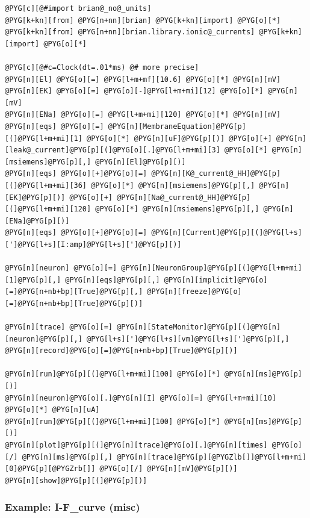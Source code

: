 \documentclass[letterpaper,10pt,english]{manual}
\begin{document}
\begin{Verbatim}[commandchars=@\[\]]
@PYG[c][@#import brian@_no@_units]
@PYG[k+kn][from] @PYG[n+nn][brian] @PYG[k+kn][import] @PYG[o][*]
@PYG[k+kn][from] @PYG[n+nn][brian.library.ionic@_currents] @PYG[k+kn][import] @PYG[o][*]

@PYG[c][@#c=Clock(dt=.01*ms) @# more precise]
@PYG[n][El] @PYG[o][=] @PYG[l+m+mf][10.6] @PYG[o][*] @PYG[n][mV]
@PYG[n][EK] @PYG[o][=] @PYG[o][-]@PYG[l+m+mi][12] @PYG[o][*] @PYG[n][mV]
@PYG[n][ENa] @PYG[o][=] @PYG[l+m+mi][120] @PYG[o][*] @PYG[n][mV]
@PYG[n][eqs] @PYG[o][=] @PYG[n][MembraneEquation]@PYG[p][(]@PYG[l+m+mi][1] @PYG[o][*] @PYG[n][uF]@PYG[p][)] @PYG[o][+] @PYG[n][leak@_current]@PYG[p][(]@PYG[o][.]@PYG[l+m+mi][3] @PYG[o][*] @PYG[n][msiemens]@PYG[p][,] @PYG[n][El]@PYG[p][)]
@PYG[n][eqs] @PYG[o][+]@PYG[o][=] @PYG[n][K@_current@_HH]@PYG[p][(]@PYG[l+m+mi][36] @PYG[o][*] @PYG[n][msiemens]@PYG[p][,] @PYG[n][EK]@PYG[p][)] @PYG[o][+] @PYG[n][Na@_current@_HH]@PYG[p][(]@PYG[l+m+mi][120] @PYG[o][*] @PYG[n][msiemens]@PYG[p][,] @PYG[n][ENa]@PYG[p][)]
@PYG[n][eqs] @PYG[o][+]@PYG[o][=] @PYG[n][Current]@PYG[p][(]@PYG[l+s][']@PYG[l+s][I:amp]@PYG[l+s][']@PYG[p][)]

@PYG[n][neuron] @PYG[o][=] @PYG[n][NeuronGroup]@PYG[p][(]@PYG[l+m+mi][1]@PYG[p][,] @PYG[n][eqs]@PYG[p][,] @PYG[n][implicit]@PYG[o][=]@PYG[n+nb+bp][True]@PYG[p][,] @PYG[n][freeze]@PYG[o][=]@PYG[n+nb+bp][True]@PYG[p][)]

@PYG[n][trace] @PYG[o][=] @PYG[n][StateMonitor]@PYG[p][(]@PYG[n][neuron]@PYG[p][,] @PYG[l+s][']@PYG[l+s][vm]@PYG[l+s][']@PYG[p][,] @PYG[n][record]@PYG[o][=]@PYG[n+nb+bp][True]@PYG[p][)]

@PYG[n][run]@PYG[p][(]@PYG[l+m+mi][100] @PYG[o][*] @PYG[n][ms]@PYG[p][)]
@PYG[n][neuron]@PYG[o][.]@PYG[n][I] @PYG[o][=] @PYG[l+m+mi][10] @PYG[o][*] @PYG[n][uA]
@PYG[n][run]@PYG[p][(]@PYG[l+m+mi][100] @PYG[o][*] @PYG[n][ms]@PYG[p][)]
@PYG[n][plot]@PYG[p][(]@PYG[n][trace]@PYG[o][.]@PYG[n][times] @PYG[o][/] @PYG[n][ms]@PYG[p][,] @PYG[n][trace]@PYG[p][@PYGZlb[]]@PYG[l+m+mi][0]@PYG[p][@PYGZrb[]] @PYG[o][/] @PYG[n][mV]@PYG[p][)]
@PYG[n][show]@PYG[p][(]@PYG[p][)]
\end{Verbatim}

\resetcurrentobjects
\hypertarget{--doc-examples-misc_I-F_curve}{}

\hypertarget{index-39}{}\subsubsection{Example: I-F\_curve (misc)}
\end{document}

